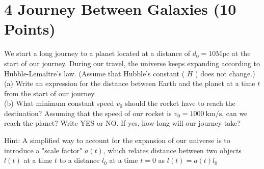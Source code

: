 \documentclass[10pt]{article}
\begin{document}
\section*{4 Journey Between Galaxies (10 Points)}
We start a long journey to a planet located at a distance of $d_{0}=10 \mathrm{Mpc}$ at the start of our journey. During our travel, the universe keeps expanding according to Hubble-Lemaître's law. (Assume that Hubble's constant ( $H$ ) does not change.)\\
(a) Write an expression for the distance between Earth and the planet at a time $t$ from the start of our journey.\\
(b) What minimum constant speed $v_{0}$ should the rocket have to reach the destination? Assuming that the speed of our rocket is $v_{0}=1000 \mathrm{~km} / \mathrm{s}$, can we reach the planet? Write YES or NO. If yes, how long will our journey take?

Hint: A simplified way to account for the expansion of our universe is to introduce a "scale factor" $a(t)$, which relates distance between two objects $l(t)$ at a time $t$ to a distance $l_{0}$ at a time $t=0$ as $l(t)=a(t) l_{0}$
\end{document}
